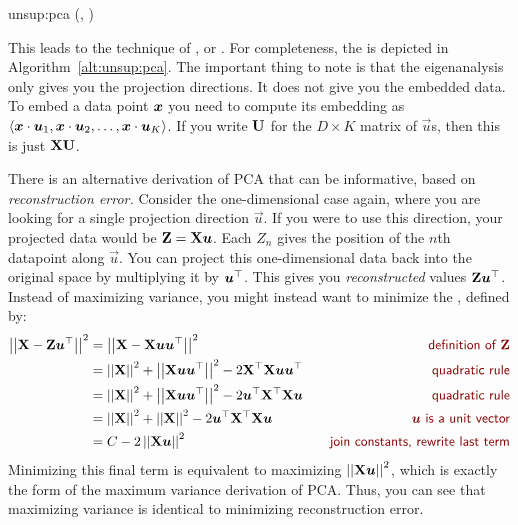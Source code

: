 \newalgorithm%
  {unsup:pca}%
  {(, )}
  {
}

This leads to the technique of , or .  For completeness, the is depicted in
Algorithm~\ref{alt:unsup:pca}.  The important thing to note is that
the eigenanalysis only gives you the projection directions.  It does
not give you the embedded data.  To embed a data point ${\boldsymbol{x}}$ you need
to compute its embedding as $\langle {\boldsymbol{x}} \cdot \boldsymbol{u}_1,
{\boldsymbol{x}} \cdot \boldsymbol{u}_2, \dots, {\boldsymbol{x}} \cdot \boldsymbol{u}_K \rangle$.  If you
write $\text{\bf U}$ for the $D \times K$ matrix of $\vec u$s, then this is
just $\text{\bf X} \text{\bf U}$.

There is an alternative derivation of PCA that can be informative,
based on \emph{reconstruction error.}  Consider the one-dimensional
case again, where you are looking for a single projection direction
$\vec u$.  If you were to use this direction, your projected data
would be $\text{\bf Z} = \text{\bf X} \boldsymbol{u}$.  Each $Z_n$ gives the position of
the $n$th datapoint along $\vec u$.  You can project this
one-dimensional data back into the original space by multiplying it by
$\boldsymbol{u}{}^\top$.  This gives you \emph{reconstructed} values $\text{\bf Z} \boldsymbol{u}{}^\top$.  Instead of maximizing variance, you might instead want to
minimize the , defined by:
%
\begin{align}
\norm{ \mat X - \mat Z\vec u\T}^2 
&= \norm{ \mat X - \mat X \vec u \vec u\T }^2 
\becauseof{definition of $\mat Z$}\\
&= \norm{\mat X}^2 
 + \norm{\mat X \vec u \vec u\T}^2
 - 2 \mat X\T \mat X \vec u \vec u\T
\becauseof{quadratic rule}\\
&= \norm{\mat X}^2 
 + \norm{\mat X \vec u \vec u\T}^2
 - 2 \vec u\T\mat X\T \mat X \vec u
\becauseof{quadratic rule}\\
&= \norm{\mat X}^2
 + \norm{\mat X}^2
 - 2 \vec u\T\mat X\T \mat X \vec u
\becauseof{$\vec u$ is a unit vector} \\
&= C - 2 \norm{\mat X \vec u}^2
\becauseof{join constants, rewrite last term}
\end{align}
%
Minimizing this final term is equivalent to maximizing $\left\vert\left\vert \text{\bf X}\boldsymbol{u} \right\vert\right\vert^2$, which is exactly the form of the maximum variance
derivation of PCA.  Thus, you can see that maximizing variance is
identical to minimizing reconstruction error.

